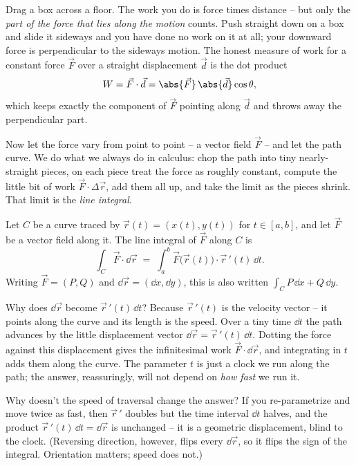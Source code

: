Drag a box across a floor. The work you do is force times distance -- but only the
\emph{part of the force that lies along the motion} counts. Push straight down on
a box and slide it sideways and you have done no work on it at all; your downward
force is perpendicular to the sideways motion. The honest measure of work for a
constant force $\vec F$ over a straight displacement $\vec d$ is the dot product
\[
  W = \vec F \cdot \vec d = \abs{\vec F}\,\abs{\vec d}\cos\theta,
\]
which keeps exactly the component of $\vec F$ pointing along $\vec d$ and throws
away the perpendicular part.

Now let the force vary from point to point -- a vector field $\vec F$ -- and let
the path curve. We do what we always do in calculus: chop the path into tiny
nearly-straight pieces, on each piece treat the force as roughly constant, compute
the little bit of work $\vec F\cdot\Delta\vec r$, add them all up, and take the
limit as the pieces shrink. That limit is the \emph{line integral}.

\begin{definition}
\label{ch35:def-lineint}
Let $C$ be a curve traced by $\vec r(t)=(x(t),y(t))$ for $t\in[a,b]$, and let
$\vec F$ be a vector field along it. The line integral of $\vec F$ along $C$ is
\[
  \int_C \vec F\cdot \dd\vec r
  \;=\; \int_a^b \vec F\big(\vec r(t)\big)\cdot \vec r\,'(t)\,\dd t.
\]
Writing $\vec F=(P,Q)$ and $\dd\vec r = (\dd x,\dd y)$, this is also written
$\displaystyle \int_C P\,\dd x + Q\,\dd y$.
\end{definition}

\begin{whybox}
Why does $\dd\vec r$ become $\vec r\,'(t)\,\dd t$? Because $\vec r\,'(t)$ is the
velocity vector -- it points along the curve and its length is the speed. Over a
tiny time $\dd t$ the path advances by the little displacement vector
$\dd\vec r = \vec r\,'(t)\,\dd t$. Dotting the force against this displacement
gives the infinitesimal work $\vec F\cdot\dd\vec r$, and integrating in $t$ adds
them along the curve. The parameter $t$ is just a clock we run along the path; the
answer, reassuringly, will not depend on \emph{how fast} we run it.
\end{whybox}

\begin{walkbox}
Why doesn't the speed of traversal change the answer? If you re-parametrize and
move twice as fast, then $\vec r\,'$ doubles but the time interval $\dd t$ halves,
and the product $\vec r\,'(t)\,\dd t = \dd\vec r$ is unchanged -- it is a geometric
displacement, blind to the clock. (Reversing direction, however, flips every
$\dd\vec r$, so it flips the sign of the integral. Orientation matters; speed does
not.)
\end{walkbox}

